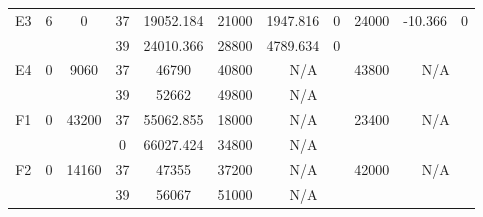 \begin{sidewaystable}
\begin{tabular}{c||c|c||c|c|c|c|c||c|c|c}
         &
        
      \\
      \hline
      \multirow{2}{*}{E3} &
      \multirow{2}{*}{6} &
      \multirow{2}{*}{0} &
      37 &
      19052.184 &
      21000 &
        1947.816 &
        0 &
      \multirow{2}{*}{24000} &
        \multirow{2}{*}{-10.366} &
        \multirow{2}{*}{0}
      \\
      \cline{4-8}
       &
       &
       &
      39 &
      24010.366 &
      28800 &
        4789.634 &
        0 &
      
         &
        
      \\
      \hline
      \multirow{2}{*}{E4} &
      \multirow{2}{*}{0} &
      \multirow{2}{*}{9060} &
      37 &
      46790 &
      40800 &
        \multicolumn{2}{|c||}{N/A} &
      \multirow{2}{*}{43800} &
        \multicolumn{2}{c}{\multirow{2}{*}{N/A}}
      \\
      \cline{4-8}
       &
       &
       &
      39 &
      52662 &
      49800 &
        \multicolumn{2}{|c||}{N/A} &
      
        
      \\
      \hline
      \multirow{2}{*}{F1} &
      \multirow{2}{*}{0} &
      \multirow{2}{*}{43200} &
      37 &
      55062.855 &
      18000 &
        \multicolumn{2}{|c||}{N/A} &
      \multirow{2}{*}{23400} &
        \multicolumn{2}{c}{\multirow{2}{*}{N/A}}
      \\
      \cline{4-8}
       &
       &
       &
      0 &
      66027.424 &
      34800 &
        \multicolumn{2}{|c||}{N/A} &
      
        
      \\
      \hline
      \multirow{2}{*}{F2} &
      \multirow{2}{*}{0} &
      \multirow{2}{*}{14160} &
      37 &
      47355 &
      37200 &
        \multicolumn{2}{|c||}{N/A} &
      \multirow{2}{*}{42000} &
        \multicolumn{2}{c}{\multirow{2}{*}{N/A}}
      \\
      \cline{4-8}
       &
       &
       &
      39 &
      56067 &
      51000 &
        \multicolumn{2}{|c||}{N/A} &
      
        
      \\
\end{tabular}
\label{table:RDS3-13338.tex} 
\end{sidewaystable}